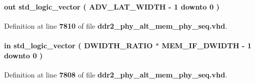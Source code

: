 \paragraph[{rd\+\_\+lat}]{ {\bfseries \textcolor{keywordflow}{out}\textcolor{vhdlchar}{ }} {\bfseries \textcolor{comment}{std\+\_\+logic\+\_\+vector}\textcolor{vhdlchar}{ }\textcolor{vhdlchar}{(}\textcolor{vhdlchar}{ }\textcolor{vhdlchar}{ }\textcolor{vhdlchar}{ }\textcolor{vhdlchar}{ }{\bfseries {\bf A\+D\+V\+\_\+\+L\+A\+T\+\_\+\+W\+I\+D\+TH}} \textcolor{vhdlchar}{-\/}\textcolor{vhdlchar}{ } \textcolor{vhdldigit}{1} \textcolor{vhdlchar}{ }\textcolor{keywordflow}{downto}\textcolor{vhdlchar}{ }\textcolor{vhdlchar}{ } \textcolor{vhdldigit}{0} \textcolor{vhdlchar}{ }\textcolor{vhdlchar}{)}\textcolor{vhdlchar}{ }} \hspace{0.3cm}{\ttfamily [Port]}}\label{classddr2__phy__alt__mem__phy__dgrb_a83d06c6013432e436bd02db2ec248778}


Definition at line {\bf 7810} of file {\bf ddr2\+\_\+phy\+\_\+alt\+\_\+mem\+\_\+phy\+\_\+seq.\+vhd}.

\paragraph[{rdata}]{ {\bfseries \textcolor{keywordflow}{in}\textcolor{vhdlchar}{ }} {\bfseries \textcolor{comment}{std\+\_\+logic\+\_\+vector}\textcolor{vhdlchar}{ }\textcolor{vhdlchar}{(}\textcolor{vhdlchar}{ }\textcolor{vhdlchar}{ }\textcolor{vhdlchar}{ }\textcolor{vhdlchar}{ }{\bfseries {\bf D\+W\+I\+D\+T\+H\+\_\+\+R\+A\+T\+IO}} \textcolor{vhdlchar}{$\ast$}\textcolor{vhdlchar}{ }\textcolor{vhdlchar}{ }\textcolor{vhdlchar}{ }{\bfseries {\bf M\+E\+M\+\_\+\+I\+F\+\_\+\+D\+W\+I\+D\+TH}} \textcolor{vhdlchar}{-\/}\textcolor{vhdlchar}{ } \textcolor{vhdldigit}{1} \textcolor{vhdlchar}{ }\textcolor{keywordflow}{downto}\textcolor{vhdlchar}{ }\textcolor{vhdlchar}{ } \textcolor{vhdldigit}{0} \textcolor{vhdlchar}{ }\textcolor{vhdlchar}{)}\textcolor{vhdlchar}{ }} \hspace{0.3cm}{\ttfamily [Port]}}\label{classddr2__phy__alt__mem__phy__dgrb_a182cd026b115827d8631a2d0e58d4a49}


Definition at line {\bf 7808} of file {\bf ddr2\+\_\+phy\+\_\+alt\+\_\+mem\+\_\+phy\+\_\+seq.\+vhd}.

